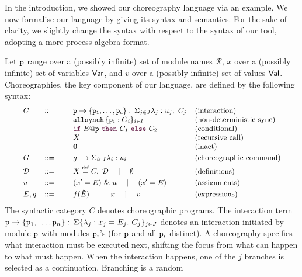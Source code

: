 In the introduction, we showed our choreography language via an
example. We now formalise our language by giving its syntax and
semantics. For the sake of clarity, we slightly change the syntax with
respect to the syntax of our tool, adopting a more process-algebra
format.

%
Let $\mathtt{p}$ range over a (possibly infinite) set of module names
$\mathcal R$, $x$ over a (possibly infinite) set of variables $\mathsf{Var}$,
and $v$ over a (possibly infinite) set of values $\mathsf{Val}$.
%
Choreographies, the key component of our language, are defined by the
following syntax:
%
\begin{displaymath}\small
  \begin{array}{llllllllllll}
    C & ::= &      & \interact{p}{\role p_1,\ldots,\role p_n} & \text{(interaction)}\\
      &     & \mid & \allsynch pGiI & \text{(non-deterministic sync)}\\
      &     & \mid & \ifTE {E}{p}{C_1}{C_2} & \text{(conditional)}\\
      &     & \mid & X     & \text{(recursive call)}\\
      &     & \mid & \CEnd & \text{(inact)}
    \\[1mm]
    G & ::= &      & \chorcommand g\lambda u & \text{(choreographic command)}
    \\[1mm]
    \defin \ & ::= & & X\stackrel{\mathsf{def}}{=} C,\ \defin 
                     \quad \mid \quad \emptyset & \text{(definitions)}
    \\[1mm]
    u     & ::=  && (x' = E)\ \&\ u \quad\mid\quad    (x' = E) & \text{(assignments)}\\[1mm]
    E, g  & ::=  && f(\tilde E)\quad\mid\quad x\quad\mid\quad v & \text{(expressions)}
  \end{array}
\end{displaymath}
%
The syntactic category $C$ denotes choreographic programs. The
interaction term
$\mathtt{p}\rightarrow \{\mathtt{p}_1,\ldots,\mathtt{p}_n\}:\,\Sigma\{\lambda_j: x_j=E_j.\ C_j\}_{j\in J}$ denotes an
interaction initiated by module $\mathtt{p}$ with modules $\mathtt{p}_i$'s
(for $\mathtt{p}$ and all $\mathtt{p}_i$ distinct). A choreography specifies
what interaction must be executed next, shifting the focus from what
can happen to what must happen. When the interaction happens, one of
the $j$ branches is selected as a continuation. Branching is a random
